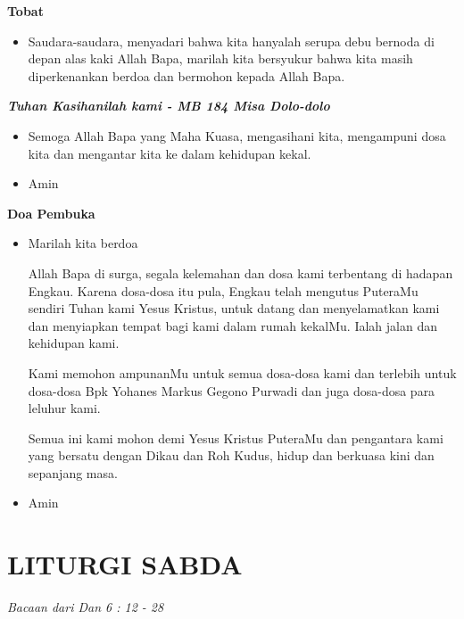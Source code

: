 \documentclass[a5paper,titlepage,10pt,openany]{scrbook}
\makeatletter
\newcommand{\subjudul}[1]{%
  {\parindent \z@ 
    \interlinepenalty\@M \bfseries #1\par\nobreak \vskip 10\p@ }}
\newcommand{\lagu}[1]{%
  {\parindent \z@ 
    \interlinepenalty\@M \slshape \bfseries \normalsize \textit{#1}\par\nobreak \vskip 10\p@ }}
\newcommand{\keterangan}[1]{%
  {\parindent \z@  \slshape 
    \interlinepenalty\@M \textsl{#1}\par\nobreak  \vskip 5\p@}}
\newcommand{\BU}[1]{\begin{itemize} \item[U:] #1 \end{itemize}}
\newcommand{\BI}[1]{\begin{itemize} \item[I:] #1 \end{itemize}}
\newcommand{\namaalm}{Bpk Yohanes Markus Gegono Purwadi }
\makeatother
\begin{document}
 

\subjudul{Tobat}

\BI{Saudara-saudara, menyadari bahwa kita hanyalah serupa 
debu bernoda di depan alas kaki Allah Bapa, marilah kita 
bersyukur bahwa kita masih diperkenankan berdoa dan 
bermohon kepada Allah Bapa. }

 

\lagu{Tuhan Kasihanilah kami - MB 184 Misa Dolo-dolo}


\BI{Semoga Allah Bapa yang Maha Kuasa, mengasihani kita, 
mengampuni dosa kita dan mengantar kita ke dalam 
kehidupan kekal.}

\BU{Amin}

 

\subjudul{Doa Pembuka}

\BI{Marilah kita berdoa 

Allah Bapa di surga, segala kelemahan dan dosa kami 
terbentang di hadapan Engkau. Karena dosa-dosa itu 
pula, Engkau telah mengutus PuteraMu sendiri Tuhan 
kami Yesus Kristus, untuk datang dan menyelamatkan 
kami dan menyiapkan tempat bagi kami dalam rumah 
kekalMu. Ialah jalan dan kehidupan kami. 

Kami memohon ampunanMu untuk semua dosa-dosa kami 
dan terlebih untuk dosa-dosa \namaalm dan juga dosa-dosa para leluhur kami. 

Semua ini kami mohon demi Yesus Kristus PuteraMu dan 
pengantara kami yang bersatu dengan Dikau dan Roh 
Kudus, hidup dan berkuasa kini dan sepanjang masa.}

\BU{Amin}

 

\section*{LITURGI SABDA} 

\keterangan{Bacaan dari Dan 6 : 12 - 28}
\end{document}
